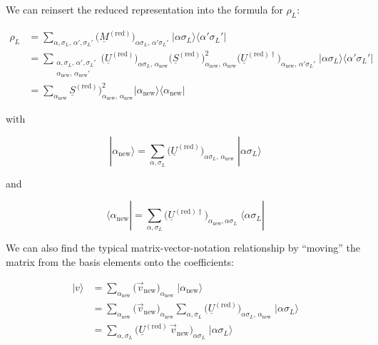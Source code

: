 We can reinsert the reduced representation into the formula for
$\rho_L$:

\begin{align}
\rho_L &= \sum_{\alpha,\sigma_L,\,\alpha',\sigma_L'}
\big(\underline{M}^{(\mathrm{red})}\big)_{\alpha\sigma_L,\,\alpha'\sigma_L'}\;
\big|\alpha\sigma_L\big\rangle\big\langle\alpha'\sigma_L'\big|\\
&= \sum_{\substack{\alpha,\sigma_L,\,\alpha',\sigma_L'\\ \alpha_{\mathrm{new}},\,\alpha_{\mathrm{new}}'}}
\big(\underline{U}^{(\mathrm{red})}\big)_{\alpha\sigma_L,\,\alpha_{\mathrm{new}}}
\big(\underline{S}^{(\mathrm{red})}\big)^2_{\alpha_{\mathrm{new}},\,\alpha_{\mathrm{new}}}
\big(\underline{U}^{(\mathrm{red})\dagger}\big)_{\alpha_{\mathrm{new}},\,\alpha'\sigma_L'}\;
\big|\alpha\sigma_L\big\rangle\big\langle\alpha'\sigma_L'\big| \\
&= \sum_{\alpha_{\mathrm{new}}} \underline{S}^{(\mathrm{red})}\big)^2_{\alpha_{\mathrm{new}},\,\alpha_{\mathrm{new}}} \big|\alpha_{\mathrm{new}}\big\rangle\big\langle\alpha_{\mathrm{new}}\big|
\end{align}

with

\begin{equation}
\boxed{\;|\alpha_{\mathrm{new}}\rangle = \sum_{\alpha,\sigma_L}\big(\underline{U}^{(\mathrm{red})}\big)_{\alpha\sigma_L,\,\alpha_{\mathrm{new}}}\;|\alpha\sigma_L\rangle\;}
\end{equation}

and 

\begin{equation}
\boxed{\;\langle\alpha_{\mathrm{new}}| = \sum_{\alpha,\sigma_L}\big(\underline{U}^{(\mathrm{red})\dagger}\big)_{\alpha_{\mathrm{new}},\alpha\sigma_L}\;\langle\alpha\sigma_L|\;}
\end{equation}

We can also find the typical matrix-vector-notation relationship by
``moving'' the matrix from the basis elements onto the coefficients:

\begin{align}
|v\rangle &= \sum_{\alpha_{\mathrm{new}}}\big(\vec v_{\mathrm{new}}\big)_{\alpha_{\mathrm{new}}}\;|\alpha_{\mathrm{new}}\rangle\\
&= \sum_{\alpha_{\mathrm{new}}}\big(\vec v_{\mathrm{new}}\big)_{\alpha_{\mathrm{new}}}
\sum_{\alpha,\sigma_L}\big(\underline{U}^{(\mathrm{red})}\big)_{\alpha\sigma_L,\,\alpha_{\mathrm{new}}}\;|\alpha\sigma_L\rangle\\
&= \sum_{\alpha,\sigma_L}\Big(\underline{U}^{(\mathrm{red})}\,\vec v_{\mathrm{new}}\Big)_{\alpha\sigma_L}\;|\alpha\sigma_L\rangle
\end{align}

